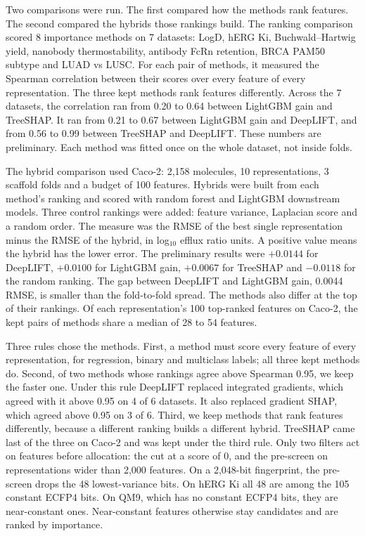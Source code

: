 Two comparisons were run. The first compared how the methods rank features. The second compared the hybrids those rankings build. The ranking comparison scored 8 importance methods on 7 datasets: LogD, hERG Ki, Buchwald--Hartwig yield, nanobody thermostability, antibody FcRn retention, BRCA PAM50 subtype and LUAD vs LUSC. For each pair of methods, it measured the Spearman correlation between their scores over every feature of every representation. The three kept methods rank features differently. Across the 7 datasets, the correlation ran from 0.20 to 0.64 between LightGBM gain and TreeSHAP. It ran from 0.21 to 0.67 between LightGBM gain and DeepLIFT, and from 0.56 to 0.99 between TreeSHAP and DeepLIFT. These numbers are preliminary. Each method was fitted once on the whole dataset, not inside folds.

The hybrid comparison used Caco-2: 2,158 molecules, 10 representations, 3 scaffold folds and a budget of 100 features. Hybrids were built from each method's ranking and scored with random forest and LightGBM downstream models. Three control rankings were added: feature variance, Laplacian score and a random order. The measure was the RMSE of the best single representation minus the RMSE of the hybrid, in log$_{10}$ efflux ratio units. A positive value means the hybrid has the lower error. The preliminary results were $+0.0144$ for DeepLIFT, $+0.0100$ for LightGBM gain, $+0.0067$ for TreeSHAP and $-0.0118$ for the random ranking. The gap between DeepLIFT and LightGBM gain, 0.0044 RMSE, is smaller than the fold-to-fold spread. The methods also differ at the top of their rankings. Of each representation's 100 top-ranked features on Caco-2, the kept pairs of methods share a median of 28 to 54 features.

Three rules chose the methods. First, a method must score every feature of every representation, for regression, binary and multiclass labels; all three kept methods do. Second, of two methods whose rankings agree above Spearman 0.95, we keep the faster one. Under this rule DeepLIFT replaced integrated gradients, which agreed with it above 0.95 on 4 of 6 datasets. It also replaced gradient SHAP, which agreed above 0.95 on 3 of 6. Third, we keep methods that rank features differently, because a different ranking builds a different hybrid. TreeSHAP came last of the three on Caco-2 and was kept under the third rule. Only two filters act on features before allocation: the cut at a score of 0, and the pre-screen on representations wider than 2,000 features. On a 2,048-bit fingerprint, the pre-screen drops the 48 lowest-variance bits. On hERG Ki all 48 are among the 105 constant ECFP4 bits. On QM9, which has no constant ECFP4 bits, they are near-constant ones. Near-constant features otherwise stay candidates and are ranked by importance.

